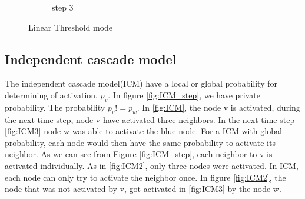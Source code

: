 \begin{figure}[!ht]
\begin{subfigure}{0.3\textwidth}
		\caption{step 3} 
		\label{fig:linearThresh3}
	\end{subfigure}
	\caption{Linear Threshold mode}
\end{figure}

\subsection{Independent cascade model}
The independent cascade model(ICM) have a local or global probability for determining of activation, $p_v$. In figure \ref{fig:ICM_step}, we have private probability. The probability $p_v != p_w$. In \ref{fig:ICM}, the node v is activated, during the next time-step, node v have activated three neighbors. In the next time-step \ref{fig:ICM3} node w was able to activate the blue node. For a ICM with global probability, each node would then have the same probability to activate its neighbor. As we can see from Figure \ref{fig:ICM_step}, each neighbor to v is activated individually. As in \ref{fig:ICM2}, only three nodes were activated. In ICM, each node can only try to activate the neighbor once. In figure \ref{fig:ICM2}, the node that was not activated by v, got activated in \ref{fig:ICM3} by the node w.


